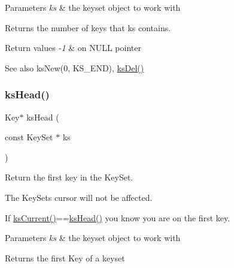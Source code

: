 \begin{DoxyParams}{Parameters}
{\em ks} & the keyset object to work with \\
\hline
\end{DoxyParams}
\begin{DoxyReturn}{Returns}
the number of keys that {\ttfamily ks} contains. 
\end{DoxyReturn}

\begin{DoxyRetVals}{Return values}
{\em -\/1} & on N\+U\+LL pointer \\
\hline
\end{DoxyRetVals}
\begin{DoxySeeAlso}{See also}
ks\+New(0, K\+S\+\_\+\+E\+N\+D), \mbox{\hyperlink{group__keyset_ga27e5c16473b02a422238c8d970db7ac8}{ks\+Del()}} 
\end{DoxySeeAlso}
\mbox{\label{group__keyset_gae7dbf3aef70e67b5328475eb3d1f92f5}} 
\subsubsection{\texorpdfstring{ksHead()}{ksHead()}}
{\footnotesize\ttfamily Key$\ast$ ks\+Head (\begin{DoxyParamCaption}\item[{const Key\+Set $\ast$}]{ks }\end{DoxyParamCaption})}



Return the first key in the Key\+Set. 

The Key\+Sets cursor will not be affected.

If \mbox{\hyperlink{group__keyset_ga4287b9416912c5f2ab9c195cb74fb094}{ks\+Current()}}==\mbox{\hyperlink{group__keyset_gae7dbf3aef70e67b5328475eb3d1f92f5}{ks\+Head()}} you know you are on the first key.


\begin{DoxyParams}{Parameters}
{\em ks} & the keyset object to work with \\
\hline
\end{DoxyParams}
\begin{DoxyReturn}{Returns}
the first Key of a keyset 
\end{DoxyReturn}

